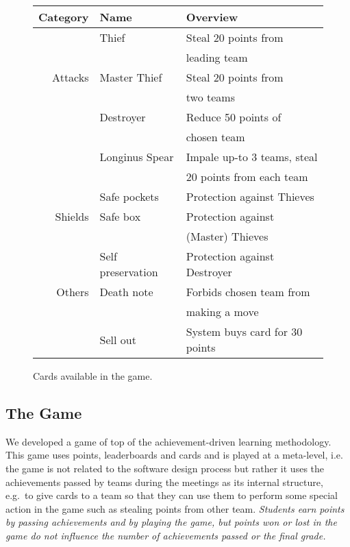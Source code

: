 \documentclass[sigconf]{acmart}
\begin{document}
\begin{figure}[t]
\begin{tabular}{|r|l|l|}
\hline
Category & Name & Overview \\
\hline
& Thief & Steal 20 points from \\
&& leading team \\ \cline{2-3}
Attacks & Master Thief & Steal 20 points from \\
&& two teams \\ \cline{2-3}
& Destroyer & Reduce 50 points of \\
&& chosen team \\ \cline{2-3}
& Longinus Spear & Impale up-to 3 teams, steal \\
&&20 points from each team \\ \cline{2-3}
\hline
& Safe pockets & Protection against Thieves  \\ \cline{2-3}
Shields & Safe box & Protection against \\
&& (Master) Thieves \\ \cline{2-3}
& Self preservation & Protection against Destroyer  \\ \cline{2-3}
\hline
Others & Death note & Forbids chosen team from \\
&& making a move\\ \cline{2-3}
& Sell out & System buys card for 30 points \\ \cline{2-3}
\hline
\end{tabular}
\caption{\label{fig:available-cards}Cards available in the game.}
\end{figure}

\hypertarget{sec:the-game}{%
\subsection{The Game}\label{sec:the-game}}

We developed a game of top of the achievement-driven learning
methodology. This game uses points, leaderboards and cards and is played
at a meta-level, i.e. the game is not related to the software design
process but rather it uses the achievements passed by teams during the
meetings as its internal structure, e.g.~to give cards to a team so that
they can use them to perform some special action in the game such as
stealing points from other team.
\textit{Students earn points by passing achievements and by playing the game, but
points won or lost in the game do not influence the number of achievements passed or the final grade.}
\end{document}
